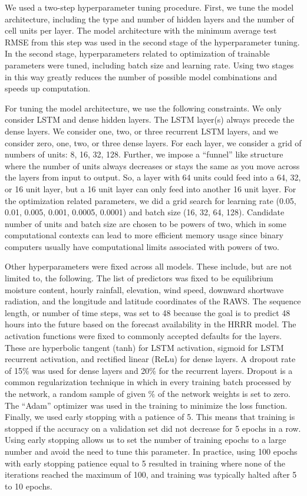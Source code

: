 \documentclass[fire,article,submit,pdftex,moreauthors]{Definitions/mdpi}
\begin{document}
We used a two-step hyperparameter tuning procedure. First, we tune the model architecture, including the type and number of hidden layers and the number of cell units per layer. The model architecture with the minimum average test RMSE from this step was used in the second stage of the hyperparameter tuning. In the second stage, hyperparameters related to optimization of trainable parameters were tuned, including batch size and learning rate. Using two stages in this way greatly reduces the number of possible model combinations and speeds up computation. 

For tuning the model architecture, we use the following constraints. We only consider LSTM and dense hidden layers. The LSTM layer(s) always precede the dense layers. We consider one, two, or three recurrent LSTM layers, and we consider zero, one, two, or three dense layers. For each layer, we consider a grid of numbers of units: 8, 16, 32, 128. Further, we impose a ``funnel'' like structure where the number of units always decreases or stays the same as you move across the layers from input to output. So, a layer with 64 units could feed into a 64, 32, or 16 unit layer, but a 16 unit layer can only feed into another 16 unit layer. For the optimization related parameters, we did a grid search for learning rate (0.05, 0.01, 0.005, 0.001, 0.0005, 0.0001) and batch size (16, 32, 64, 128). Candidate number of units and batch size are chosen to be powers of two, which in some computational contexts can lead to more efficient memory usage since binary computers usually have computational limits associated with powers of two.

Other hyperparameters were fixed across all models. These include, but are not limited to, the following. The list of predictors was fixed to be equilibrium moisture content, hourly rainfall, elevation, wind speed, downward shortwave radiation, and the longitude and latitude coordinates of the RAWS. The sequence length, or number of time steps, was set to 48 because the goal is to predict 48 hours into the future based on the forecast availability in the HRRR model. The activation functions were fixed to commonly accepted defaults for the layers. These are hyperbolic tangent (tanh) for LSTM activation, sigmoid for LSTM recurrent activation, and rectified linear (ReLu) for dense layers. A dropout rate of 15\% was used for dense layers and 20\% for the recurrent layers. Dropout is a common regularization technique in which in every training batch processed by the network, a random sample of given \% of the network weights is set to zero. The ``Adam'' optimizer was used in the training to minimize the loss function. Finally, we used early stopping with a patience of 5. This means that training is stopped if the accuracy on a validation set did not decrease for 5 epochs in a row. Using early stopping allows us to set the number of training epochs to a large number and avoid the need to tune this parameter. In practice, using 100 epochs with early stopping patience equal to 5 resulted in training where none of the iterations reached the maximum of 100, and training was typically halted after 5 to 10 epochs. 
\end{document}
